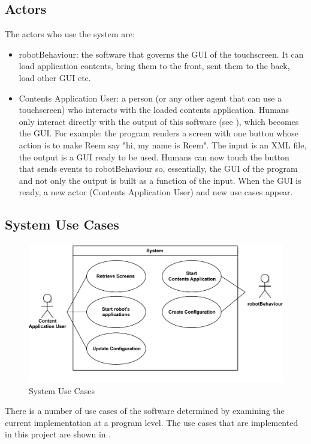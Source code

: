 \subsection{Actors}
The actors who use the system are:
\begin{itemize}
	\item robotBehaviour: the software that governs the \ac{GUI} of the touchscreen. It can load application contents, bring them to the front, sent them to the back, load other \ac{GUI} etc.
	\item Contents Application User: a person (or any other agent that can use a touchscreen) who interacts with the loaded contents application. Humans only interact directly with the output of this software (see ), which becomes the \ac{GUI}.
For example: the program renders a screen with one button whose action is to make Reem say "hi, my name is Reem".
The input is an \ac{XML} file, the output is a \ac{GUI} ready to be used.
Humans can now touch the button that sends events to robotBehaviour so, essentially, the \ac{GUI} of the program and not only the output is built as a function of the input.
When the \ac{GUI} is ready, a new actor (Contents Application User) and new use cases appear.
\end{itemize}


\subsection{System Use Cases}

\begin{figure}[htb]  
    \centering
    \includegraphics[width=\linewidth]{figures/specification-sucs}
    \caption{System Use Cases}
    \label{fig:specification-sucs}
\end{figure}

There is a number of use cases of the software determined by examining the current implementation at a program level.
The use cases that are implemented in this project are shown in .

